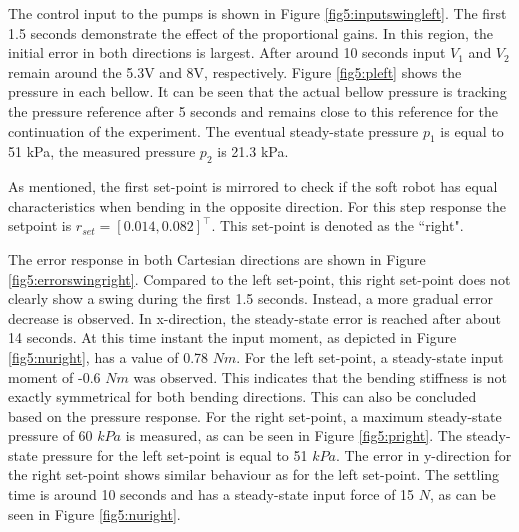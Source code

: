 The control input to the pumps is shown in Figure \ref{fig5:inputswingleft}. The first 1.5 seconds demonstrate the effect of the proportional gains. In this region, the initial error in both directions is largest. After around 10 seconds input $V_1$ and $V_2$ remain around the 5.3V and 8V, respectively. Figure \ref{fig5:pleft} shows the pressure in each bellow. It can be seen that the actual bellow pressure is tracking the pressure reference after 5 seconds and remains close to this reference for the continuation of the experiment. The eventual steady-state pressure $p_1$ is equal to 51 kPa, the measured pressure $p_2$ is 21.3 kPa. 




As mentioned, the first set-point is mirrored to check if the soft robot has equal characteristics when bending in the opposite direction. For this step response the setpoint is $r_{set} = [0.014,0.082]^\top$. This set-point is denoted as the ``right".


The error response in both Cartesian directions are shown in Figure \ref{fig5:errorswingright}. Compared to the left set-point, this right set-point does not clearly show a swing during the first 1.5 seconds. Instead, a more gradual error decrease is observed. In x-direction, the steady-state error is reached after about 14 seconds. At this time instant the input moment, as depicted in Figure \ref{fig5:nuright}, has a value of 0.78 $Nm$. For the left set-point, a steady-state input moment of -0.6 $Nm$ was observed. This indicates that the bending stiffness is not exactly symmetrical for both bending directions. This can also be concluded based on the pressure response. For the right set-point, a maximum steady-state pressure of 60 $kPa$ is measured, as can be seen in Figure \ref{fig5:pright}. The steady-state pressure for the left set-point is equal to 51 $kPa$. The error in y-direction for the right set-point shows similar behaviour as for the left set-point. The settling time is around 10 seconds and has a steady-state input force of 15 $N$, as can be seen in Figure \ref{fig5:nuright}.


